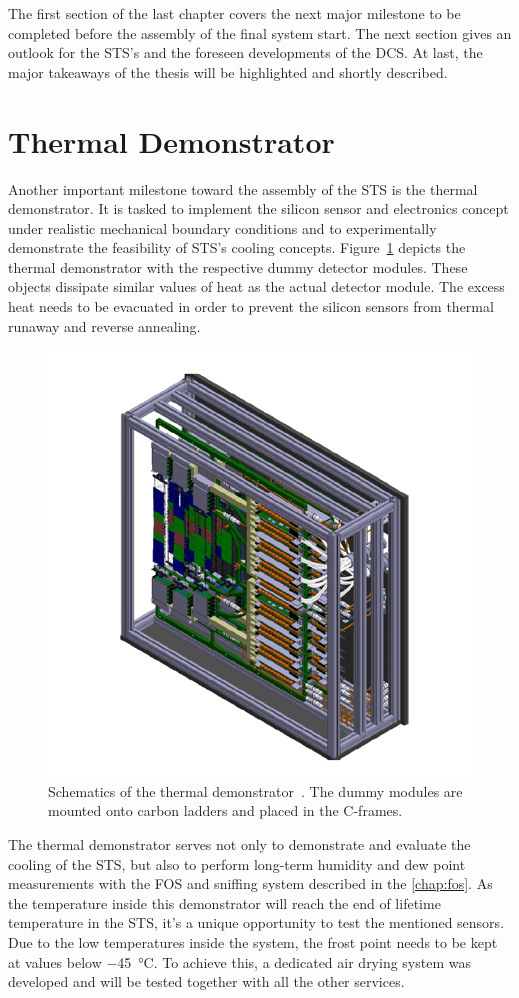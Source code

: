 The first section of the last chapter covers the next major milestone to be completed before the assembly of the final system start. The next section gives an outlook for the \gls{STS}'s and the foreseen developments of the \gls{DCS}. At last, the major takeaways of the thesis will be highlighted and shortly described.

\section{Thermal Demonstrator}
Another important milestone toward the assembly of the \gls{STS} is the thermal demonstrator. 
It is tasked to implement the silicon sensor and electronics concept under realistic mechanical boundary conditions and to experimentally demonstrate the feasibility of \gls{STS}’s cooling concepts. Figure~\ref{fig:demo} depicts the thermal demonstrator with the respective dummy detector modules. These objects dissipate similar values of heat as the actual detector module. The excess heat needs to be evacuated in order to prevent the silicon sensors from thermal runaway and reverse annealing. 
\begin{figure}[!h]
    \centering
    \includegraphics[width=0.65\columnwidth]{Chapter7/images/thermal_demo.png}
    \caption{Schematics of the thermal demonstrator~\cite{thermal_demo}. The dummy modules are mounted onto carbon ladders and placed in the C-frames.}
    \label{fig:demo}
\end{figure}
\label{demo}
 The thermal demonstrator serves not only to demonstrate and evaluate the cooling of the \gls{STS}, but also to perform long-term humidity and dew point measurements with the \gls{FOS} and sniffing system described in the \ref{chap:fos}. As the temperature inside this demonstrator will reach the end of lifetime temperature in the \gls{STS}, it's a unique opportunity to test the mentioned sensors. 
Due to the low temperatures inside the system, the frost point needs to be kept at values below \SI{-45}{\celsius}. To achieve this, a dedicated air drying system was developed and will be tested together with all the other services. 

